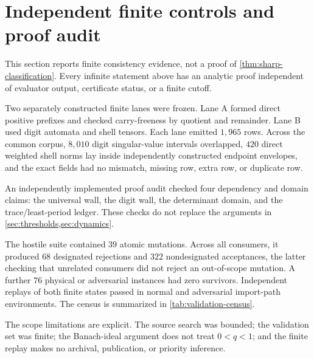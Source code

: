 \section{Independent finite controls and proof audit}
\label{sec:validation}

This section reports finite consistency evidence, not a proof of
\cref{thm:sharp-classification}.  Every infinite statement above has an
analytic proof independent of evaluator output, certificate status, or a
finite cutoff.

Two separately constructed finite lanes were frozen.  Lane A formed direct
positive prefixes and checked carry-freeness by quotient and remainder.
Lane B used digit automata and shell tensors.  Each lane emitted \(1{,}965\)
rows.  Across the common corpus, \(8{,}010\) digit singular-value intervals
overlapped, \(420\) direct weighted shell norms lay inside independently
constructed endpoint envelopes, and the exact fields had no mismatch,
missing row, extra row, or duplicate row.

An independently implemented proof audit checked four dependency and domain
claims: the universal wall, the digit wall, the determinant domain, and the
trace/least-period ledger.  These checks do not replace the arguments in
\cref{sec:thresholds,sec:dynamics}.

The hostile suite contained \(39\) atomic mutations.  Across all consumers,
it produced \(68\) designated rejections and \(322\) nondesignated
acceptances, the latter checking that unrelated consumers did not reject an
out-of-scope mutation.  A further \(76\) physical or adversarial instances
had zero survivors.  Independent replays of both finite states passed in
normal and adversarial import-path environments.  The census is
summarized in \cref{tab:validation-census}.

\begin{table}[t]
  \centering
  \small
  \resizebox{\textwidth}{!}{}
  \caption{Frozen finite and hostile-control census.  A zero in the final
  row means that no listed hostile case survived its designated checks; it
  does not certify an infinite theorem.}
  \label{tab:validation-census}
\end{table}

The scope limitations are explicit.  The source search was bounded; the
validation set was finite; the Banach-ideal argument does not treat
\(0<q<1\); and the finite replay makes no archival, publication, or
priority inference.
